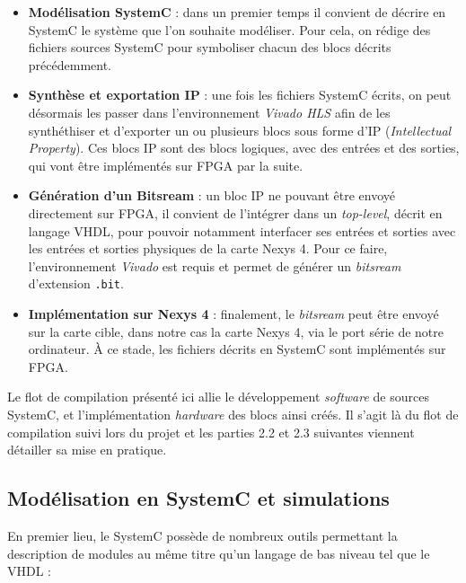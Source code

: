 \documentclass[a4paper,12pt]{article}
\begin{document}
\begin{itemize}
\item[\textbullet] \textbf{Modélisation SystemC} : dans un premier temps il convient de décrire en SystemC le système que l'on souhaite modéliser. Pour cela, on rédige des fichiers sources SystemC pour symboliser chacun des blocs décrits précédemment. \\
\item[\textbullet] \textbf{Synthèse et exportation IP} : une fois les fichiers SystemC écrits, on peut désormais les passer dans l'environnement \textit{Vivado HLS} afin de les synthéthiser et d'exporter un ou plusieurs blocs sous forme d'IP (\textit{Intellectual Property}). Ces blocs IP sont des blocs logiques, avec des entrées et des sorties, qui vont être implémentés sur FPGA par la suite. \\
\item[\textbullet] \textbf{Génération d'un Bitsream} : un bloc IP ne pouvant être envoyé directement sur FPGA, il convient de l'intégrer dans un \textit{top-level}, décrit en langage VHDL, pour pouvoir notamment interfacer ses entrées et sorties avec les entrées et sorties physiques de la carte Nexys 4. Pour ce faire, l'environnement \textit{Vivado} est requis et permet de générer un \textit{bitsream} d'extension \texttt{.bit}. \\
\item[\textbullet] \textbf{Implémentation sur Nexys 4} : finalement, le \textit{bitsream} peut être envoyé sur la carte cible, dans notre cas la carte Nexys 4, via le port série de notre ordinateur. À ce stade, les fichiers décrits en SystemC sont implémentés sur FPGA.\\
\end{itemize}

Le flot de compilation présenté ici allie le développement \textit{software} de sources SystemC, et l'implémentation \textit{hardware} des blocs ainsi créés. Il s'agit là du flot de compilation suivi lors du projet et les parties 2.2 et 2.3 suivantes viennent détailler sa mise en pratique.


\subsection{Modélisation en SystemC et simulations}
En premier lieu, le SystemC possède de nombreux outils permettant la description de modules au même titre qu'un langage de bas niveau tel que le VHDL :\\
\end{document}
